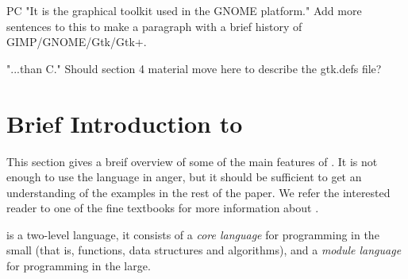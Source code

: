 \documentclass[workingdraft]{usetex-v1}
\begin{document}
\begin{ednote}{PC}
     "It is the graphical toolkit used in the GNOME platform."  Add more
   sentences to this to make a paragraph with a brief history of
   GIMP/GNOME/Gtk/Gtk+.
\end{ednote}

\begin{ednote}{}
     "...than C."  Should section 4 material move here to
   describe the gtk.defs file?

\end{ednote}





\section{Brief Introduction to \sml{}}
\label{sec:brief-intr-sml}

This section gives a breif overview of some of the main features of
\sml{}.  It is not enough to use the language in anger, but it should
be sufficient to get an understanding of the examples in the rest of
the paper.  We refer the interested reader to one of the fine textbooks
\cite{Hansen-Rischel:1999,Paulson:1996} for more information about \sml{}.



\sml{} is a two-level language, it consists of a \emph{core language}
for programming in the small (that is, functions, data structures and
algorithms), and a \emph{module language} for programming in the large.
\end{document}
